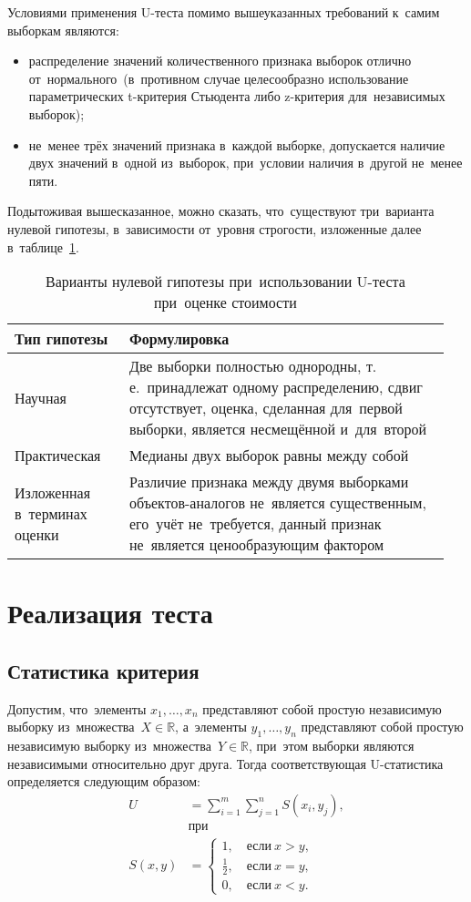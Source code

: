 \documentclass[]{scrreprt}
\begin{document}
Условиями применения U-теста помимо вышеуказанных требований к~самим выборкам являются:
\begin{itemize}
	\item распределение значений количественного признака выборок отлично от~нормального~(в~противном случае целесообразно использование параметрических t-критерия Стьюдента либо z-критерия для~независимых выборок);
	\item не~менее трёх значений признака в~каждой выборке, допускается наличие двух значений в~одной из~выборок, при~условии наличия в~другой не~менее пяти.
	\end{itemize}
Подытоживая вышесказанное, можно сказать, что~существуют три~варианта нулевой гипотезы, в~зависимости от~уровня строгости, изложенные далее в~таблице~\ref{tab:nul-hypothesis-variants}.
\begin{table}[ht]
	\caption{Варианты нулевой гипотезы при~использовании U-теста при~оценке стоимости}  \label{tab:nul-hypothesis-variants}
	\centering
	\begin{tabularx}{\textwidth}{p{0.25\linewidth} p{0.7\linewidth}} 
		\hline
		Тип гипотезы&Формулировка\\
		 \hline
		Научная&Две выборки полностью однородны, т.\,е.~принадлежат одному распределению, сдвиг отсутствует, оценка, сделанная для~первой выборки, является несмещённой и~для~второй\\
		 \hline
		Практическая&Медианы двух выборок равны между собой\\
		 \hline
		Изложенная в~терминах оценки&Различие признака между двумя выборками объектов-аналогов не~является существенным, его~учёт не~требуется, данный признак не~является ценообразующим фактором\\ \hline
	\end{tabularx}
\end{table}
\section{Реализация теста}
\subsection{Статистика критерия}
Допустим, что~элементы ${\textstyle x_{1},\ldots,x_{n}}$ представляют собой простую независимую выборку из~множества~${\textstyle X \in \mathbb{R}}$, а~элементы ${\textstyle y_{1},\ldots,y_{n}}$ представляют собой простую независимую выборку из~множества~${\textstyle Y \in \mathbb{R}}$, при~этом выборки являются независимыми относительно друг друга. Тогда соответствующая U-статистика определяется следующим образом:
\begin{equation}\label{eq:U-statistic-base-formula}
	\begin{aligned}
	U&=\sum_{i=1}^{m} \sum_{j=1}^{n} S (x_{i},y_{j}),\\
	&\text{при}\\
	S(x,y)&=
	\begin{cases}
	1,\quad \text{если}\ x>y,\\
	\frac{1}{2},\quad \text{если}\ x=y,\\
	0,\quad \text{если}\ x<y.
	\end{cases}
	\end{aligned}
\end{equation}
\end{document}
